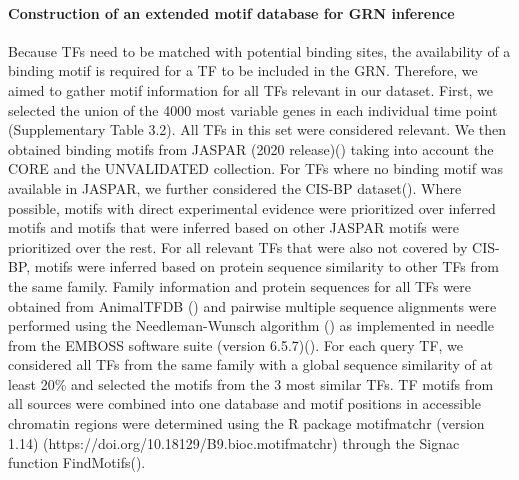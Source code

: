 \paragraph{Construction of an extended motif database for GRN inference}
Because TFs need to be matched with potential binding sites, the availability of a binding motif is required for a TF to be included in the GRN. Therefore, we aimed to gather motif information for all TFs relevant in our dataset. First, we selected the union of the 4000 most variable genes in each individual time point (Supplementary Table 3.2). All TFs in this set were considered relevant. We then obtained binding motifs from JASPAR (2020 release)(\cite{fornes_jaspar_2020}) taking into account the CORE and the UNVALIDATED collection. For TFs where no binding motif was available in JASPAR, we further considered the CIS-BP dataset(\cite{weirauch_determination_2014}). Where possible, motifs with direct experimental evidence were prioritized over inferred motifs and motifs that were inferred based on other JASPAR motifs were prioritized over the rest. For all relevant TFs that were also not covered by CIS-BP, motifs were inferred based on protein sequence similarity to other TFs from the same family. Family information and protein sequences for all TFs were obtained from AnimalTFDB (\cite{hu_animaltfdb_2019}) and pairwise multiple sequence alignments were performed using the Needleman-Wunsch algorithm (\cite{needleman_general_1970}) as implemented in needle from the EMBOSS software suite (version 6.5.7)(\cite{rice_emboss_2000}). For each query TF, we considered all TFs from the same family with a global sequence similarity of at least 20\% and selected the motifs from the 3 most similar TFs. TF motifs from all sources were combined into one database and motif positions in accessible chromatin regions were determined using the R package motifmatchr (version 1.14) (https://doi.org/10.18129/B9.bioc.motifmatchr) through the Signac function FindMotifs().
 
